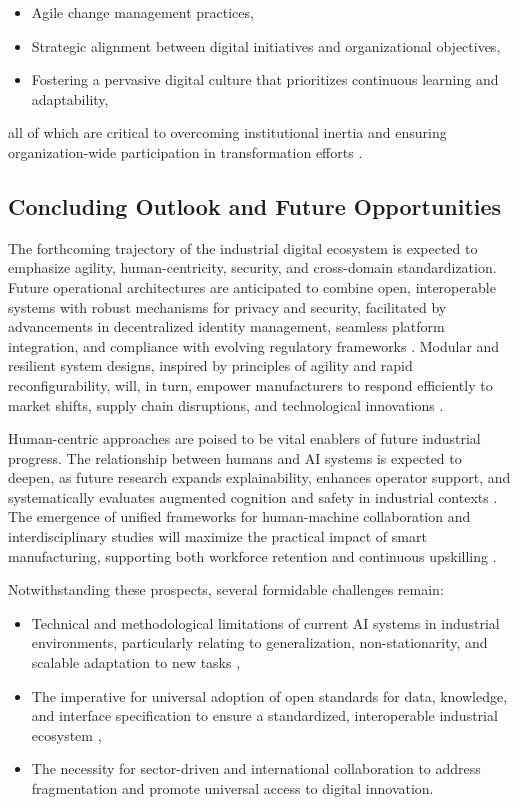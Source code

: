 \documentclass[sigconf]{acmart}
\begin{document}
\begin{itemize}
    \item Agile change management practices,
    \item Strategic alignment between digital initiatives and organizational objectives,
    \item Fostering a pervasive digital culture that prioritizes continuous learning and adaptability,
\end{itemize}

all of which are critical to overcoming institutional inertia and ensuring organization-wide participation in transformation efforts \cite{ref25}\cite{ref31}\cite{ref35}.

\subsection{Concluding Outlook and Future Opportunities}

The forthcoming trajectory of the industrial digital ecosystem is expected to emphasize agility, human-centricity, security, and cross-domain standardization. Future operational architectures are anticipated to combine open, interoperable systems with robust mechanisms for privacy and security, facilitated by advancements in decentralized identity management, seamless platform integration, and compliance with evolving regulatory frameworks \cite{ref41}\cite{ref86}\cite{ref93}. Modular and resilient system designs, inspired by principles of agility and rapid reconfigurability, will, in turn, empower manufacturers to respond efficiently to market shifts, supply chain disruptions, and technological innovations \cite{ref3}\cite{ref68}.

Human-centric approaches are poised to be vital enablers of future industrial progress. The relationship between humans and AI systems is expected to deepen, as future research expands explainability, enhances operator support, and systematically evaluates augmented cognition and safety in industrial contexts \cite{ref45}\cite{ref83}. The emergence of unified frameworks for human-machine collaboration and interdisciplinary studies will maximize the practical impact of smart manufacturing, supporting both workforce retention and continuous upskilling \cite{ref86}\cite{ref94}.

Notwithstanding these prospects, several formidable challenges remain:

\begin{itemize}
    \item Technical and methodological limitations of current AI systems in industrial environments, particularly relating to generalization, non-stationarity, and scalable adaptation to new tasks \cite{ref19}\cite{ref20}\cite{ref54},
    \item The imperative for universal adoption of open standards for data, knowledge, and interface specification to ensure a standardized, interoperable industrial ecosystem \cite{ref13}\cite{ref86},
    \item The necessity for sector-driven and international collaboration to address fragmentation and promote universal access to digital innovation.
\end{itemize}
\end{document}
